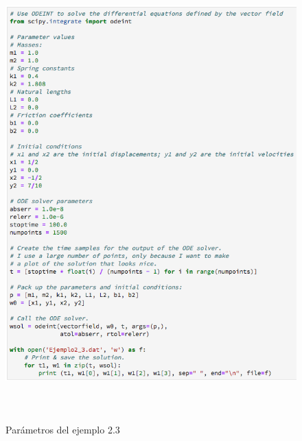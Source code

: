 \begin{figure}
	\begin{center}
        \includegraphics[height=17.5cm]{Ejem2_3-Para}
        \caption{Parámetros del ejemplo 2.3}
        \label{Ejem2.3-Para}
    \end{center}
\end{figure}
        
